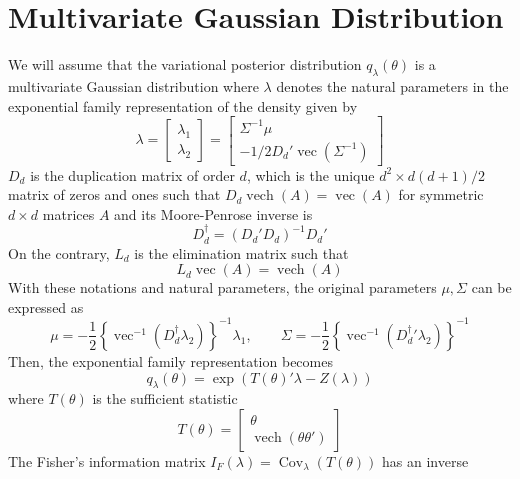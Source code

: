 \documentclass[12pt]{article}
\DeclareMathOperator{\Cov}{Cov}
\DeclareMathOperator{\vvv}{vec}
\DeclareMathOperator{\vvvh}{vech}
\begin{document}
\section{Multivariate Gaussian Distribution}
We will assume that the variational posterior distribution $q_{\lambda}(\theta)$ is a multivariate Gaussian distribution where $\lambda$ denotes the natural parameters in the exponential family representation of the density given by
\begin{equation}
  \lambda = \begin{bmatrix} \lambda_{1} \\ \lambda_{2} \end{bmatrix} = \begin{bmatrix} \Sigma^{-1}\mu \\ -1/2 D_{d}'\vvv \left(\Sigma^{-1}\right) \end{bmatrix}
\end{equation}
$D_{d}$ is the duplication matrix of order $d$, which is the unique $d^{2}\times d(d+1)/2$ matrix of zeros and ones such that $D_{d}\vvvh(A)=\vvv(A)$ for symmetric $d\times d$ matrices $A$ and its Moore-Penrose inverse is
\begin{equation}
  D_{d}^{\dagger} = \left(D_{d}'D_{d}\right)^{-1}D_{d}'
\end{equation}
On the contrary, $L_{d}$ is the elimination matrix such that
\begin{equation}
  L_{d}\vvv(A)=\vvvh(A)
\end{equation}
With these notations and natural parameters, the original parameters $\mu,\Sigma$ can be expressed as
\begin{equation}
  \mu=-\dfrac{1}{2}\left\{\vvv^{-1}\left(D_{d}^{\dagger}\lambda_{2}\right) \right\}^{-1}\lambda_{1},\qquad \Sigma = -\dfrac{1}{2}\left\{\vvv^{-1}\left({D_{d}^{\dagger}}'\lambda_{2}\right)\right\}^{-1}
\end{equation}
Then, the exponential family representation becomes
\begin{equation}
  q_{\lambda}(\theta) = \exp\left(T(\theta)'\lambda-Z(\lambda)\right)
\end{equation}
where $T(\theta)$ is the sufficient statistic
\begin{equation}
  T(\theta) = \begin{bmatrix} \theta \\ \vvvh\left(\theta\theta'\right)\end{bmatrix}
\end{equation}
The Fisher's information matrix $I_{F}(\lambda)=\Cov_{\lambda}(T(\theta))$ has an inverse
\end{document}
